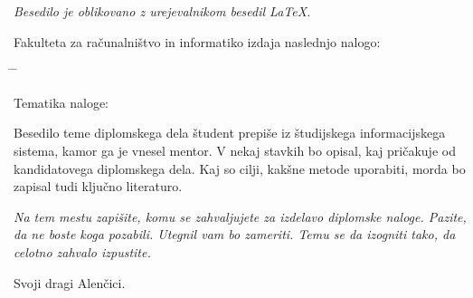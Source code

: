 \documentclass[a4paper, 12p]{book}
\newcommand{\clearemptydoublepage}{\newpage{\pagestyle{empty}\cleardoublepage}}
\begin{document}
\begin{center}
\mbox{}\vfill
\emph{Besedilo je oblikovano z urejevalnikom besedil \LaTeX.}
\end{center}
\clearemptydoublepage

\thispagestyle{empty}
\vspace*{4cm}

\noindent
Fakulteta za računalništvo in informatiko izdaja naslednjo nalogo:
\medskip
\begin{tabbing}
\hspace{32mm}\= \hspace{6cm} \= \kill




Tematika naloge:
\end{tabbing}
Besedilo teme diplomskega dela študent prepiše iz študijskega informacijskega sistema, kamor ga je vnesel mentor. V nekaj stavkih bo opisal, kaj pričakuje od kandidatovega diplomskega dela. Kaj so cilji, kakšne metode uporabiti, morda bo zapisal tudi ključno literaturo.
\vspace{15mm}






\vspace{2cm}

\clearemptydoublepage

\thispagestyle{empty}\mbox{}\vfill\null\it%
\noindent
Na tem mestu zapišite, komu se zahvaljujete za izdelavo diplomske naloge. Pazite, da ne boste koga pozabili. Utegnil vam bo zameriti. Temu se da izogniti tako, da celotno zahvalo izpustite.
\rm\normalfont

\clearemptydoublepage

\thispagestyle{empty}\mbox{}{\textheight}\mbox{}\hfill\begin{minipage}{0.55\textwidth}%
Svoji dragi Alenčici.
\normalfont\end{minipage}

\clearemptydoublepage


\pagestyle{empty}
\def\thepage{}%
\tableofcontents{}


\clearemptydoublepage

\end{document}

